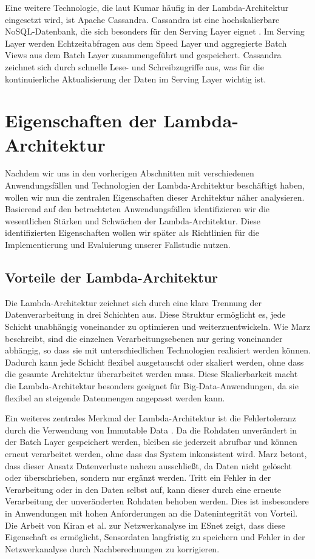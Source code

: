 Eine weitere Technologie, die laut Kumar \cite{kumar2020lambda} häufig in der Lambda-Architektur eingesetzt wird, ist Apache Cassandra. Cassandra ist eine hochskalierbare NoSQL-Datenbank, die sich besonders für den Serving Layer eignet \cite{warren2015big}. Im Serving Layer werden Echtzeitabfragen aus dem Speed Layer und aggregierte Batch Views aus dem Batch Layer zusammengeführt und gespeichert. Cassandra zeichnet sich durch schnelle Lese- und Schreibzugriffe aus, was für die kontinuierliche Aktualisierung der Daten im Serving Layer wichtig ist.

\section{Eigenschaften der Lambda-Architektur}
Nachdem wir uns in den vorherigen Abschnitten mit verschiedenen Anwendungsfällen und Technologien der Lambda-Architektur beschäftigt haben, wollen wir nun die zentralen Eigenschaften dieser Architektur näher analysieren. Basierend auf den betrachteten Anwendungsfällen identifizieren wir die wesentlichen Stärken und Schwächen der Lambda-Architektur. Diese identifizierten Eigenschaften wollen wir später als Richtlinien für die Implementierung und Evaluierung unserer Fallstudie nutzen.

\subsection{Vorteile der Lambda-Architektur}
Die Lambda-Architektur zeichnet sich durch eine klare Trennung der Datenverarbeitung in drei Schichten aus. Diese Struktur ermöglicht es, jede Schicht unabhängig voneinander zu optimieren und weiterzuentwickeln. Wie Marz \cite{warren2015big} beschreibt, sind die einzelnen Verarbeitungsebenen nur gering voneinander abhängig, so dass sie mit unterschiedlichen Technologien realisiert werden können. Dadurch kann jede Schicht flexibel ausgetauscht oder skaliert werden, ohne dass die gesamte Architektur überarbeitet werden muss. Diese Skalierbarkeit macht die Lambda-Architektur besonders geeignet für Big-Data-Anwendungen, da sie flexibel an steigende Datenmengen angepasst werden kann.

Ein weiteres zentrales Merkmal der Lambda-Architektur ist die Fehlertoleranz durch die Verwendung von Immutable Data \cite{warren2015big}. Da die Rohdaten unverändert in der Batch Layer gespeichert werden, bleiben sie jederzeit abrufbar und können erneut verarbeitet werden, ohne dass das System inkonsistent wird. Marz \cite{warren2015big} betont, dass dieser Ansatz Datenverluste nahezu ausschließt, da Daten nicht gelöscht oder überschrieben, sondern nur ergänzt werden. Tritt ein Fehler in der Verarbeitung oder in den Daten selbst auf, kann dieser durch eine erneute Verarbeitung der unveränderten Rohdaten behoben werden. Dies ist insbesondere in Anwendungen mit hohen Anforderungen an die Datenintegrität von Vorteil. Die Arbeit von Kiran et al. \cite{kiran2015lambda} zur Netzwerkanalyse im ESnet zeigt, dass diese Eigenschaft es ermöglicht, Sensordaten langfristig zu speichern und Fehler in der Netzwerkanalyse durch Nachberechnungen zu korrigieren.

